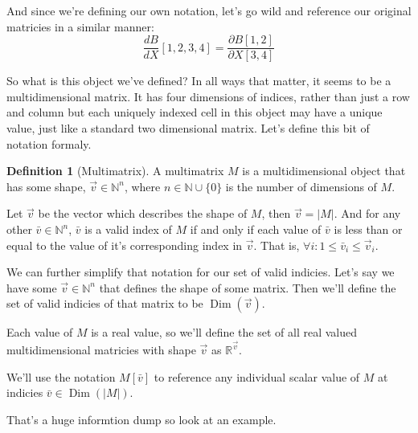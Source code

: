 \documentclass[12pt]{book}
\theoremstyle{plain}
\theoremstyle{definition}
\newtheorem{definition}{Definition}[chapter]
\theoremstyle{ppart}
\theoremstyle{case}
\theoremstyle{solution}
\DeclareMathOperator{\Dim}{Dim}
\begin{document}
And since we're defining our own notation, let's go wild and reference our original
matricies in a similar manner:
\[
\frac{dB}{dX}[1,2,3,4] = \frac{\partial B[1,2]}{\partial X[3,4]}
\]

So what is this object we've defined? In all ways that matter, it seems to be
a multidimensional matrix. It has four dimensions of indices, rather than just
a row and column but each uniquely indexed cell in this object may have a
unique value, just like a standard two dimensional matrix. Let's define this
bit of notation formaly.

\begin{definition}[Multimatrix]
A multimatrix $M$ is a multidimensional object that has some shape,
$\vec{v} \in \mathbb{N}^n$, where $n \in \mathbb{N} \cup \{0\}$
is the number of dimensions of $M$.

Let $\vec{v}$ be the vector which describes the shape of
$M$, then $\vec{v} = |M|$. And for any other $\bar{v} \in \mathbb{N}^n$, $\bar{v}$
is a valid index of $M$ if and only if each value of $\bar{v}$ is less than or equal
to the value of it's corresponding index in $\vec{v}$.
That is, $\forall i: 1 \le \bar{v}_i \le \vec{v}_i$.

We can further simplify that notation for our set of valid indicies. Let's say we have
some $\vec{v} \in \mathbb{N}^n$ that defines the shape of some matrix. Then we'll
define the set of valid indicies of that matrix to be $\Dim(\vec{v})$. 

Each value of $M$ is a real value, so we'll define the set of all real valued
multidimensional matricies with shape $\vec{v}$ as $\mathbb{R}^{\vec{v}}$.

We'll use the notation $M[\bar{v}]$ to reference any individual scalar value of $M$
at indicies $\bar{v} \in \Dim(|M|)$. 
\end{definition}

That's a huge informtion dump so look at an example.
\end{document}
